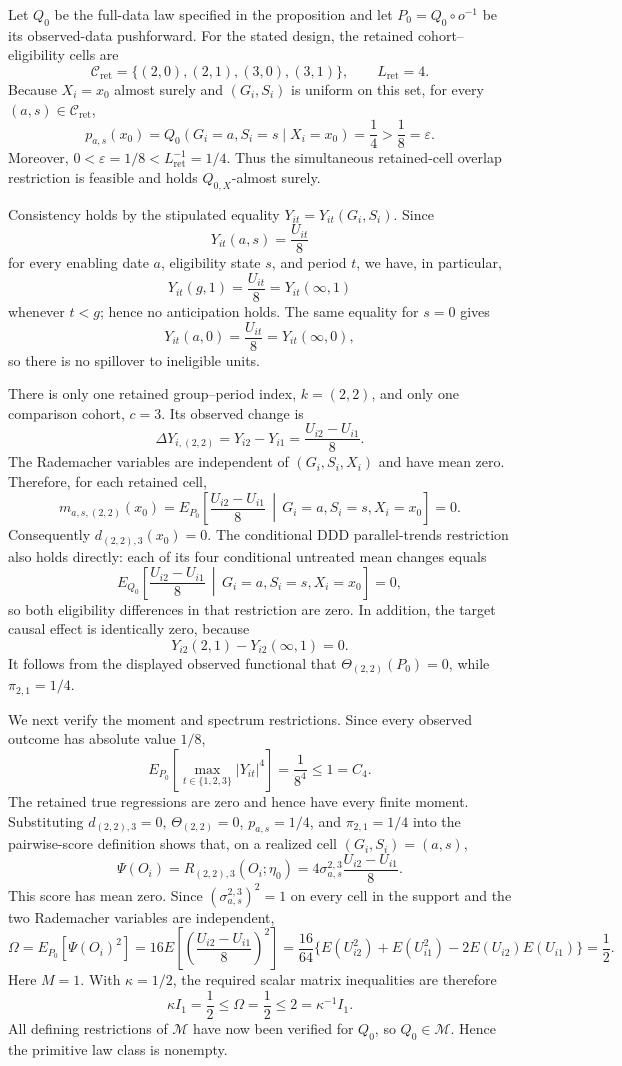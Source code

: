 Let \(Q_0\) be the full-data law specified in the proposition and let \(P_0=Q_0\circ o^{-1}\) be its observed-data pushforward. For the stated design, the retained cohort--eligibility cells are
\[
\mathcal C_{\mathrm{ret}}=\{(2,0),(2,1),(3,0),(3,1)\},
\qquad L_{\mathrm{ret}}=4.
\]
Because \(X_i=x_0\) almost surely and \((G_i,S_i)\) is uniform on this set, for every \((a,s)\in\mathcal C_{\mathrm{ret}}\),
\[
p_{a,s}(x_0)=Q_0(G_i=a,S_i=s\mid X_i=x_0)=\frac14>\frac18=\varepsilon.
\]
Moreover, \(0<\varepsilon=1/8<L_{\mathrm{ret}}^{-1}=1/4\). Thus the simultaneous retained-cell overlap restriction is feasible and holds \(Q_{0,X}\)-almost surely.

Consistency holds by the stipulated equality \(Y_{it}=Y_{it}(G_i,S_i)\). Since
\[
Y_{it}(a,s)=\frac{U_{it}}8
\]
for every enabling date \(a\), eligibility state \(s\), and period \(t\), we have, in particular,
\[
Y_{it}(g,1)=\frac{U_{it}}8=Y_{it}(\infty,1)
\]
whenever \(t<g\); hence no anticipation holds. The same equality for \(s=0\) gives
\[
Y_{it}(a,0)=\frac{U_{it}}8=Y_{it}(\infty,0),
\]
so there is no spillover to ineligible units.

There is only one retained group--period index, \(k=(2,2)\), and only one comparison cohort, \(c=3\). Its observed change is
\[
\Delta Y_{i,(2,2)}=Y_{i2}-Y_{i1}=\frac{U_{i2}-U_{i1}}8.
\]
The Rademacher variables are independent of \((G_i,S_i,X_i)\) and have mean zero. Therefore, for each retained cell,
\[
m_{a,s,(2,2)}(x_0)
=E_{P_0}\!\left[\frac{U_{i2}-U_{i1}}8\,\middle|\,G_i=a,S_i=s,X_i=x_0\right]
=0.
\]
Consequently \(d_{(2,2),3}(x_0)=0\). The conditional DDD parallel-trends restriction also holds directly: each of its four conditional untreated mean changes equals
\[
E_{Q_0}\!\left[\frac{U_{i2}-U_{i1}}8\,\middle|\,G_i=a,S_i=s,X_i=x_0\right]=0,
\]
so both eligibility differences in that restriction are zero. In addition, the target causal effect is identically zero, because
\[
Y_{i2}(2,1)-Y_{i2}(\infty,1)=0.
\]
It follows from the displayed observed functional that \(\Theta_{(2,2)}(P_0)=0\), while \(\pi_{2,1}=1/4\).

We next verify the moment and spectrum restrictions. Since every observed outcome has absolute value \(1/8\),
\[
E_{P_0}\!\left[\max_{t\in\{1,2,3\}}|Y_{it}|^4\right]
=\frac1{8^4}
\le 1=C_4.
\]
The retained true regressions are zero and hence have every finite moment. Substituting \(d_{(2,2),3}=0\), \(\Theta_{(2,2)}=0\), \(p_{a,s}=1/4\), and \(\pi_{2,1}=1/4\) into the pairwise-score definition shows that, on a realized cell \((G_i,S_i)=(a,s)\),
\[
\Psi(O_i)
=R_{(2,2),3}(O_i;\eta_0)
=4\sigma_{a,s}^{2,3}\frac{U_{i2}-U_{i1}}8.
\]
This score has mean zero. Since \((\sigma_{a,s}^{2,3})^2=1\) on every cell in the support and the two Rademacher variables are independent,
\[
\Omega
=E_{P_0}[\Psi(O_i)^2]
=16E\!\left[\left(\frac{U_{i2}-U_{i1}}8\right)^2\right]
=\frac{16}{64}\{E(U_{i2}^2)+E(U_{i1}^2)-2E(U_{i2})E(U_{i1})\}
=\frac12.
\]
Here \(M=1\). With \(\kappa=1/2\), the required scalar matrix inequalities are therefore
\[
\kappa I_1=\frac12\le\Omega=\frac12\le 2=\kappa^{-1}I_1.
\]
All defining restrictions of \(\mathcal M\) have now been verified for \(Q_0\), so \(Q_0\in\mathcal M\). Hence the primitive law class is nonempty.